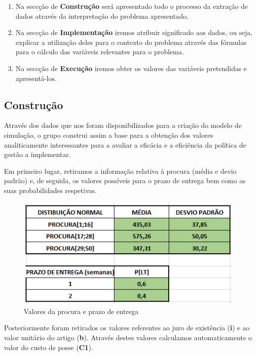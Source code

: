 \documentclass[a4paper]{article}
\begin{document}
\begin{enumerate}
	\item Na seccção de \textbf{Construção} será apresentado todo o processo da extração de dados através da interpretação do problema apresentado.
	\item Na seccção de \textbf{Implementação} iremos atribuir significado aos dados, ou seja, explicar a utilização deles para o contexto do problema através das fórmulas para o cálculo das variáveis relevantes para o problema.
	\item Na seccção de \textbf{Execução} iremos obter os valores das variáveis pretendidas e apresentá-los.
\end{enumerate}

\newpage

\subsection{Construção}

Através dos dados que nos foram disponibilizados para a criação do modelo de simulação, o grupo construi assim a base para a obtenção dos valores analiticamente interessantes para a avaliar a eficácia e a eficiência da política de gestão a implementar.

Em primeiro lugar, retiramos a informação relativa à procura (média e devio padrão) e, de seguida, os valores possíveis para o prazo de entrega bem como as suas probabilidades respetivas.

\begin{figure}[H]
\centering
\includegraphics[scale=0.6]{distribuicaoeprazo.png}
\caption{Valores da procura e prazo de entrega}
\label{img:ProcuraePrazo}
\end{figure}

Posteriormente foram retirados os valores referentes ao juro de existência (\textbf{i}) e ao valor unitário do artigo (\textbf{b}). Através destes valores calculamos automaticamente o valor do custo de posse (\textbf{C1}).
\end{document}
